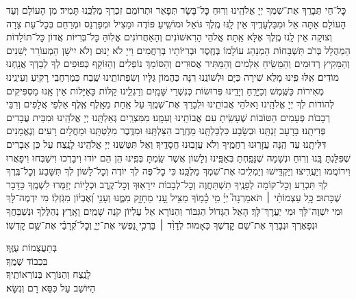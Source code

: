 \documentclass[twoside, openany, parskip=half, 11pt]{book}
\begin{document}
\label{nishmas}
כׇּל־חַי תְּבָרֵךְ אֶת־שִׁמְךָ יְיָ אֱלֹהֵֽינוּ וְרֽוּחַ כׇּל־בָּשָׂר תְּפָאֵר וּתְרוֹמֵם זִכְרְךָ מַלְכֵּֽנוּ תָּמִיד׃ מִן הָעוֹלָם וְעַד הָעוֹלָם אַתָּה אֵל וּמִבַּלְעָדֶֽיךָ אֵין לָֽנּוּ מֶֽלֶךְ גּוֹאֵל וּמוֹשִֽׁיעַ׃
פּוֹדֶה וּמַצִיל וּמְפַרְנֵס וּמְרַחֵם בְּכׇל־עֵת צָרָה וְצוּקָה אֵין לָֽנוּ מֶֽלֶךְ אֶלָּא אַֽתָּה׃ אֱלֹהֵי הָרִאשׁוֹנִים וְהָאַחֲרוֹנִים אֱלֽוֹהַּ כׇּל־בְּרִיּוֹת אֲדוֹן כׇּל־תּוֹלָדוֹת הַמְהֻלָּל בְּרֹב תִּשְׁבָּחוֹת הַמְנַהֵג עוֹלָמוֹ בְּחֶֽסֶד וּבְרִיּוֹתָיו בְּרַחֲמִים׃ וַייָ לֹא יָנוּם וְלֹא יִישָׁן הַמְעוֹרֵר יְשֵׁנִים וְהַמֵּקִיץ רְדוּמִים וְהַמֵּשִֽׂיחַ אִלְּמִים וְהַמַּתִּיר אֲסוּרִים וְהַסּוֹמֵךְ נוֹפְלִים וְהַזּוֹקֵף כְּפוּפִים לְךָ לְבַדְּךָ אֲנַֽחְנוּ מוֹדִים׃ אִֽלּוּ פִֽינוּ מָלֵא שִׁירָה כַּיָּם וּלְשׁוֹנֵֽנוּ רִנָּה כַּהֲמוֹן גַּלָּיו וְשִׂפְתוֹתֵֽינוּ שֶֽׁבַח כְּמֶרְחֲבֵי רָקִֽיעַ וְעֵינֵֽינוּ מְאִירוֹת כַּשֶּֽׁמֶשׁ וְכַיָּרֵֽחַ וְיָדֵֽינוּ פְּרוּשׂוֹת כְּנִשְׁרֵי שָּׁמָֽיִם וְרַגְלֵֽינוּ קַלּוֹת כָּאַיָּלוֹת אֵין אָֽנוּ מַסְפִּיקִים לְהוֹדוֹת לְךָ יְיָ אֱלֹהֵֽינוּ וֵאלֹהֵי אֲבוֹתֵֽינוּ וּלְבָרֵךְ אֶת־שְׁמֶֽךָ עַל אַֽחַת מֵאָֽלֶף אֶֽלֶף אַלְפֵי אֲלָפִים וְרִבֵּי רְבָבוֹת פְּעָמִים הַטּוֹבוֹת שֶׁעָשִֽׂיתָ עִם אֲבוֹתֵֽינוּ וְעִמָּֽנוּ׃ מִמִּצְרַֽיִם גְּאַלְתָּֽנוּ יְיָ אֱלֹהֵֽינוּ וּמִבֵּית עֲבָדִים פְּדִיתָֽנוּ׃ בָּרָעָב זַנְתָּֽנוּ וּבְשָׂבָע כִּלְכַּלְתָּֽנוּ מֵחֶֽרֶב הִצַּלְתָּֽנּוּ וּמִדֶּֽבֶר מִלַּטְתָּֽנוּ וּמֵחֳלָיִם רָעִים וְנֶאֱמָנִים דִּלִּיתָֽנוּ׃ עַד הֵֽנָּה עֲזָרֽוּנוּ רַחֲמֶֽיךָ וְלֹא עֲזָבֽוּנוּ חֲסָדֶֽיךָ׃ וְאַל תִּטְּשֵׁנוּ יְיָ אֱלֹהֵֽינוּ לָנֶֽצַח׃ עַל כֵּן אֵבָרִים שֶׁפִּלַּגְתָּ בָּֽנוּ וְרֽוּחַ וּנְשָׁמָה שֶׁנָּפַֽחְתָּ בְּאַפֵּֽינוּ וְלָשׁוֹן אֲשֶׁר שַֽׂמְתָּ בְּפִֽינוּ הֵן הֵם יוֹדוּ וִיבָרְכוּ וִישַׁבְּחוּ וִיפָאֲרוּ וִירוֹמֲמוּ וְיַעֲרִֽיצוּ וְיַקְדִּֽישׁוּ וְיַמְלִֽיכוּ אֶת־שִׁמְךָ מַלְכֵּֽנוּ׃ כִּי כׇל־פֶּה לְךָ יוֹדֶה וְכׇל־לָשׁוֹן לְךָ תִּשָּׁבַע וְכׇל־בֶּֽרֶךְ לְךָ תִּכְרַע וְכׇל־קוֹמָה לְפָנֶֽיךָ תִשְׁתַּחֲוֶה וְכׇל־לְבָבוֹת יִירָאֽוּךָ וְכׇל־קֶֽרֶב וּכְלָיוֹת יְזַמְּרוּ לִשְׁמֶֽךָ כַּדָּבָר שֶׁכָּתוּב׃
כׇּ‍֥ל עַצְמוֹתַ֨י ׀ תֹּאמַרְנָה֮ יְיָ֗ מִ֥י כָ֫מ֥וֹךָ מַצִּ֣יל עָ֭נִי מֵחָזָ֣ק מִמֶּ֑נּוּ וְעָנִ֥י וְ֝אֶבְי֗וֹן מִגֹּֽזְלֽוֹ׃
מִי יִדְמֶה־לָּךְ וּמִי יִשְׁוֶה־לָּךְ וּמִי יַעֲרׇךְ־לָּךְ׃ הָאֵל הַגָּדוֹל הַגִּבּוֹר וְהַנּוֹרָא אֵל עֶלְיוֹן קֹנֵה שָׁמַֽיִם וָאָֽרֶץ׃
נְהַלֶּלְךָ וּנְשַׁבֵּחֲךָ וּנְפָאֶרְךָ וּנְבָרֵךְ אֶת־שֵׁם קׇדְשֶׁךָ כָּאָמוּר׃
לְדָוִ֨ד  ׀ בָּרְכִ֣י נַ֭פְשִׁי אֶת־יְיָ֑ וְכׇל־קְ֝רָבַ֗י אֶת־שֵׁ֥ם קׇדְשֽׁוֹ׃


בְּתַעֲצֻמוֹת עֻזֶּֽךָ׃\\
בִּכְבוֹד שְׁמֶֽךָ׃\\
לָנֶֽצַח וְהַנּוֹרָא בְּנוֹרְאוֹתֶֽיךָ׃\\
הַיּוֹשֵׁב עַל כִּסֵּא רָם וְנִשָּׂא׃
\end{document}

